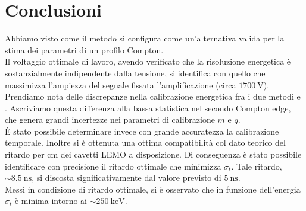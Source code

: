 \documentclass[a4paper,11pt,italian]{report}
\begin{document}
\section*{Conclusioni}

Abbiamo visto come il metodo  si configura come un'alternativa valida per la stima dei parametri di un profilo Compton.\\

Il voltaggio ottimale di lavoro, avendo verificato che la risoluzione energetica è sostanzialmente indipendente dalla tensione, si identifica con quello che massimizza l'ampiezza del segnale fissata l'amplificazione (circa $\SI{1700}{\volt}$).\\

Prendiamo nota delle discrepanze nella calibrazione energetica fra i due metodi  e . Ascriviamo questa differenza alla bassa statistica nel secondo Compton edge, che genera grandi incertezze nei parametri di calibrazione $m$ e $q$.\\

\`E stato possibile determinare invece con grande accuratezza la calibrazione temporale. Inoltre si è ottenuta una ottima compatibilità col dato teorico del ritardo per cm dei cavetti LEMO a disposizione. Di conseguenza è stato possibile identificare con precisione il ritardo ottimale che minimizza $\sigma_t$. Tale ritardo, $\sim \SI{8.5}{\nano\second}$, si discosta significativamente dal valore previsto di $\SI{5}{\nano\second}$.\\

Messi in condizione di ritardo ottimale, si è osservato che in funzione dell'energia $\sigma_t$ è minima intorno ai $\sim \SI{250}{\kilo\electronvolt}$.
\end{document}
